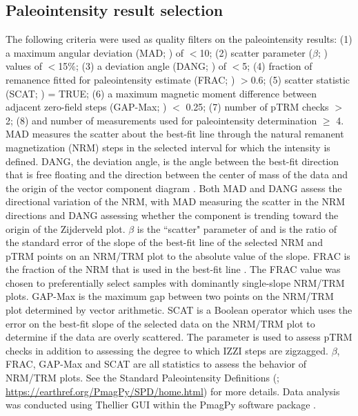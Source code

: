 \documentclass[9pt,twocolumn,twoside,lineno]{pnas-new}
\begin{document}
{\subsection*{Paleointensity result selection}
The following criteria were used as quality filters on the paleointensity results: (1) a maximum angular deviation (MAD;  \citealp{Kirschvink1980a}) of $<$10\textdegree; (2) scatter parameter ($\beta$;  \citealp{Coe1978a}) values of $<$15$\%$; (3) a deviation angle (DANG;  \citealp{Tauxe2004a}) of $<$5\textdegree; (4) fraction of remanence fitted for paleointensity estimate (FRAC;  \cite{Shaar2013a}) $>$0.6; (5) scatter statistic (SCAT;  \citealp{Shaar2013a}) = TRUE; (6) a maximum magnetic moment difference between adjacent zero-field steps (GAP-Max;  \citealp{Shaar2013a}) $<$ 0.25; (7) number of pTRM checks $>$ 2; (8) and number of measurements used for paleointensity determination $\geq$ 4. MAD measures the scatter about the best-fit line through the natural remanent magnetization (NRM) steps in the selected interval for which the intensity is defined. DANG, the deviation angle, is the angle between the best-fit direction that is free floating and the direction between the center of mass of the data and the origin of the vector component diagram \cite{Tauxe2004a}. Both MAD and DANG assess the directional variation of the NRM, with MAD measuring the scatter in the NRM directions and DANG assessing whether the component is trending toward the origin of the Zijderveld plot. $\beta$ is the ``scatter" parameter of  \cite{Coe1978a} and is the ratio of the standard error of the slope of the best-fit line of the selected NRM and pTRM points on an NRM/TRM plot to the absolute value of the slope. FRAC is the fraction of the NRM that is used in the best-fit line \cite{Shaar2013a}. The FRAC value was chosen to preferentially select samples with dominantly single-slope NRM/TRM plots. GAP-Max is the maximum gap between two points on the NRM/TRM plot determined by vector arithmetic. SCAT is a Boolean operator which uses the error on the best-fit slope of the selected data on the NRM/TRM plot to determine if the data are overly scattered. The parameter is used to assess pTRM checks in addition to assessing the degree to which IZZI steps are zigzagged. $\beta$, FRAC, GAP-Max and SCAT are all statistics to assess the behavior of NRM/TRM plots. See the Standard Paleointensity Definitions (\citealp{Paterson2014a}; \url{https://earthref.org/PmagPy/SPD/home.html}) for more details. Data analysis was conducted using Thellier GUI \cite{Shaar2013a} within the PmagPy software package \cite{Tauxe2016a}.

}
\end{document}
